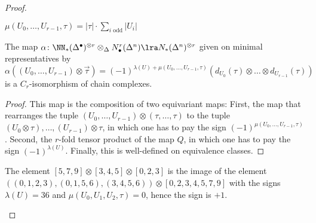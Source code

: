 \begin{proof}
\begin{definition}
\begin{itemize}
\end{itemize}
\end{definition}
\begin{remark}
    $\mu(U_0,\ldots,U_{r-1},\tau)= |\tau|\cdot \sum_{i\text{ odd}} |U_i|$
\end{remark}
\begin{lemma}
	The map $\alpha\colon \NN_*(\Delta^\bullet)^{\otimes r}\otimes_{\Delta} N_\bullet^r(\Delta^n)\lra N_*(\Delta^n)^{\otimes r}$ given on minimal representatives by
	\[\alpha((U_0,\ldots,U_{r-1})\otimes \vec{\tau}) = (-1)^{\lambda(U)+ \mu(U_0,\ldots,U_{r-1},\tau)}(d_{U_0}(\tau)\otimes \ldots\otimes d_{U_{r-1}}(\tau))\]
	is a $C_r$-isomorphism of chain complexes.
\end{lemma}
\begin{proof} This map is the composition of two equivariant maps: First, the map that rearranges the tuple $(U_0,\ldots,U_{r-1})\otimes (\tau,\ldots,\tau)$ to the tuple $(U_0\otimes \tau),\ldots,(U_{r-1})\otimes \tau$, in which one has to pay the sign $(-1)^{\mu(U_0,\ldots,U_{r-1},\tau)}$. Second, the $r$-fold tensor product of the map $Q$, in which one has to pay the sign $(-1)^{\lambda(U)}$. Finally, this is well-defined on equivalence classes.
\end{proof}
\begin{example}\label{ex:102}
    The element $[5,7,9]\otimes [3,4,5]\otimes [0,2,3]$ is the image of the element $((0,1,2,3),(0,1,5,6),(3,4,5,6))\otimes [0,2,3,4,5,7,9]$ with the signs $\lambda(U) = 36$ and $\mu(U_0,U_1,U_2,\tau) = 0$, hence the sign is $+1$.
\end{example}






\end{proof}
